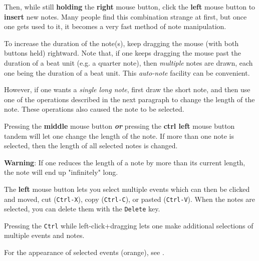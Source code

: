   Then, while still \textbf{holding} the \textbf{right} mouse button, click
   the \textbf{left} mouse button to \textbf{insert} new notes.  Many people
   find this combination strange at first, but once one gets used to it, it
   becomes a very fast method of note manipulation.

   To increase the duration of the note(s), keep dragging the mouse (with
   both buttons held) rightward.
   Note that, if one keeps dragging the mouse past the duration of a
   beat unit (e.g. a quarter note), then \textsl{multiple} notes are drawn,
   each one being the duration of a beat unit.  This \textsl{auto-note}
   facility can be convenient.
   
   However, if one wants a \textsl{single long note}, first draw the
   short note, and then use one of the operations described in the next
   paragraph to change the length of the note.  These operations also caused
   the note to be selected.

   Pressing the \textbf{middle} mouse button \textbf{\textsl{or}}
   pressing the \textbf{ctrl left} mouse button tandem will let one change 
	the length of the note. 
   If more than one note is selected, then the length of all selected notes
   is changed.
   
   \textbf{Warning}:  If one reduces the length of a note by more than its
   current length, the note will end up "infinitely" long.

	The \textbf{left} mouse button lets you select multiple events 
   which can then be clicked and moved,
    cut (\texttt{Ctrl-X}), 
    copy (\texttt{Ctrl-C}),
    or pasted (\texttt{Ctrl-V}).
   When the notes are selected,
    you can delete them with the \texttt{Delete} key.

   Pressing the \texttt{Ctrl} while left-click+dragging lets one
   make additional selections of multiple events and notes.

   For the appearance of selected events (orange), see
   .

